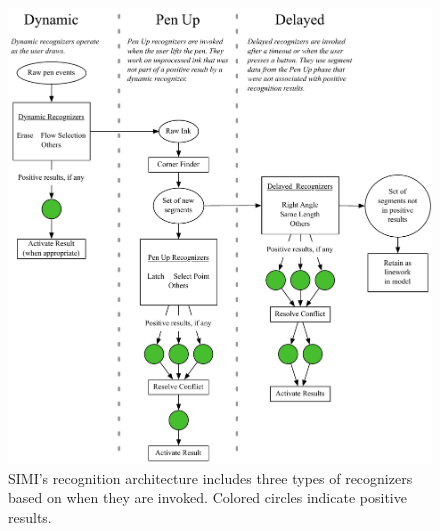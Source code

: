 \begin{figure}[p]
  \centering
  \includegraphics[width=\linewidth]{img/recognition-architecture.pdf}
  \caption[SIMI Recognition Architecture]{SIMI's recognition
    architecture includes three types of recognizers based on when
    they are invoked. Colored circles indicate positive results.}
  \label{fig:recog-arch}
\end{figure}
